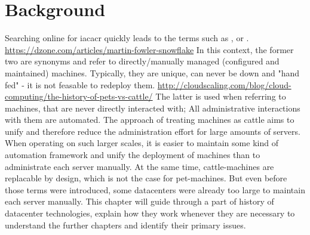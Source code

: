 \chapter{Background}




Searching online for \gls{iacacr} quickly leads to the terms such as ,  or . \url{https://dzone.com/articles/martin-fowler-snowflake}
In this context, the former two are synonyms and refer to directly/manually managed (configured and maintained) machines. Typically, they are unique, can never be down and "hand fed" - it is not feasable to redeploy them. \url{http://cloudscaling.com/blog/cloud-computing/the-history-of-pets-vs-cattle/} The latter is used when referring to machines, that are never directly interacted with; All administrative interactions with them are automated.
The approach of treating machines as cattle aims to unify and therefore reduce the administration effort for large amounts of servers. When operating on such larger scales, it is easier to maintain some kind of automation framework and unify the deployment of machines than to administrate each server manually. At the same time, cattle-machines are replacable by design, which is not the case for pet-machines.
But even before those terms were introduced, some datacenters were already too large to maintain each server manually.
This chapter will guide through a part of history of datacenter technologies, explain how they work whenever they are necessary to understand the further chapters and identify their primary issues.


